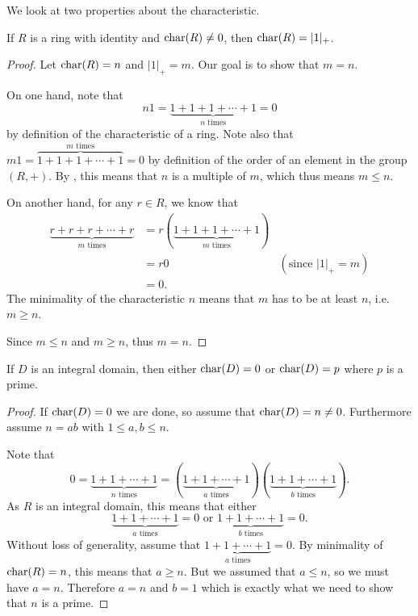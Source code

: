 We look at two properties about the characteristic.
\begin{proposition}\label{prop-characteristic-of-ring-with-identity}
    If $R$ is a ring with identity and $\mathrm{char}(R) \neq 0$, then $\mathrm{char}(R) = |1|_+$.
\end{proposition}
\begin{proof}
    Let $\mathrm{char}(R) = n$ and $|1|_+ = m$. Our goal is to show that $m = n$.

    On one hand, note that
    \[
        n1 = \underbrace{1+1+1+\cdots+1}_{n \text{ times}} = 0
    \]
    by definition of the characteristic of a ring. Note also that $m1 = \overbrace{1+1+1+\cdots+1}^{m \text{ times}} = 0$ by definition of the order of an element in the group $(R, +)$. By , this means that $n$ is a multiple of $m$, which thus means $m \leq n$.

    On another hand, for any $r \in R$, we know that
    \begin{align*}
        \underbrace{r + r + r + \cdots + r}_{m \text{ times}} &= r(\underbrace{1+1+1+\cdots+1}_{m \text{ times}})\\
        &= r0 & (\text{since } |1|_+ = m)\\
        &= 0.
    \end{align*}
    The minimality of the characteristic $n$ means that $m$ has to be at least $n$, i.e. $m \geq n$.

    Since $m \leq n$ and $m \geq n$, thus $m = n$.
\end{proof}

\begin{proposition}\label{prop-zero-or-prime-characteristic-if-integral-domain}
    If $D$ is an integral domain, then either $\mathrm{char}(D) = 0$ or $\mathrm{char}(D) = p$ where $p$ is a prime.
\end{proposition}
\begin{proof}
    If $\mathrm{char}(D) = 0$ we are done, so assume that $\mathrm{char}(D) = n \neq 0$. Furthermore assume $n = ab$ with $1 \leq a,b \leq n$.

    Note that
    \[
        0 = \underbrace{1 + 1 + \cdots + 1}_{n \text{ times}} = (\underbrace{1+1+\cdots+1}_{a \text{ times}})(\underbrace{1+1+\cdots+1}_{b \text{ times}}).
    \]
    As $R$ is an integral domain, this means that either
    \[
        \underbrace{1+1+\cdots+1}_{a \text{ times}} = 0 \text{ or } \underbrace{1+1+\cdots+1}_{b \text{ times}} = 0.
    \]
    Without loss of generality, assume that $\underbrace{1+1+\cdots+1}_{a \text{ times}} = 0$. By minimality of $\mathrm{char}(R) = n$, this means that $a \geq n$. But we assumed that $a \leq n$, so we must have $a = n$. Therefore $a = n$ and $b = 1$ which is exactly what we need to show that $n$ is a prime.
\end{proof}

